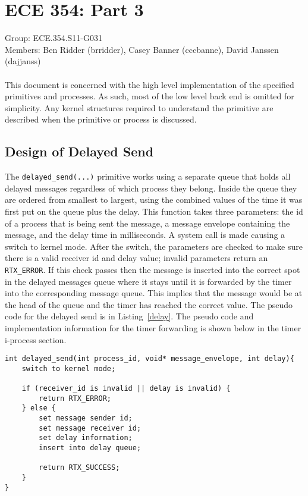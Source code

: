 \documentclass[oneside]{article}
\begin{document}
\lstset{language=C, 
        frame=single, 
        breaklines=true,
        basicstyle=\small\ttfamily,
        columns=fullflexible}
\section*{ECE 354: Part 3}
Group: ECE.354.S11-G031 \\
Members: Ben Ridder (brridder), Casey Banner (cccbanne), 
David Janssen (dajjanss) \\ \\
This document is concerned with the high level implementation of the specified
primitives and processes. As such, most of the low level back end is omitted
for simplicity. Any kernel structures required to understand the primitive are
described when the primitive or process is discussed.

\subsection*{Design of Delayed Send} 
The \texttt{delayed\_send(...)} primitive works using a separate queue that
holds all delayed messages regardless of which process they belong. Inside
the queue they are ordered from smallest to largest, using the combined values
of the time it was first put on the queue plus the delay.  This function takes
three parameters: the id of a process that is being sent the message, a
message envelope containing the message, and the delay time in milliseconds. A
system call is made causing a switch to kernel mode.  After the switch, the
parameters are checked to make sure there is a valid receiver id and delay
value; invalid parameters return an \texttt{RTX\_ERROR}. If this check passes
then the message is inserted into the correct spot in the delayed messages
queue where it stays until it is forwarded by the timer into the corresponding
message queue. This implies that the message would be at the head of the queue
and the timer has reached the correct value. The pseudo code for the delayed
send is in Listing~\ref{delay}. The pseudo code and implementation information
for the timer forwarding is shown below in the timer i-process section.

\begin{lstlisting}
int delayed_send(int process_id, void* message_envelope, int delay){
    switch to kernel mode;

    if (receiver_id is invalid || delay is invalid) {
        return RTX_ERROR;
    } else {
        set message sender id;
        set message receiver id;
        set delay information;
        insert into delay queue;

        return RTX_SUCCESS;
    }
}
\end{lstlisting}
\end{document}
